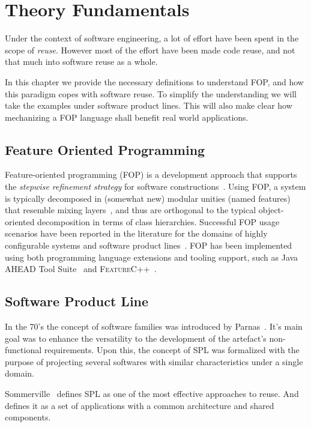 \chapter{Theory Fundamentals}\label{chap:theo-fund}
Under the context of software engineering, a lot of effort have been spent in the scope of \textit{reuse}.
However most of the effort have been made code reuse, and not that much into software reuse as a whole.

In this chapter we provide the necessary definitions to understand \gls{FOP},
and how this paradigm copes with software reuse.
To simplify the understanding we will take the examples under software product lines.
This will also make clear how mechanizing a \gls{FOP} language shall benefit real world applications.


\section{Feature Oriented Programming}\label{seq:fop}

Feature-oriented programming (FOP) is a development approach 
that supports the \emph{stepwise refinement strategy} for software 
constructions~\cite{batory-tse2004}. Using FOP, a system is 
typically decomposed in (somewhat new) modular unities 
(named features) that resemble mixing layers~\cite{bracha-ecoop1990}, 
and thus are orthogonal to the typical object-oriented 
decomposition in terms of class hierarchies. 
Successful FOP usage scenarios have been reported in the literature 
for the domains of highly configurable systems and
software product lines~\cite{mezini2004variability, apel2009overview}.
FOP has been implemented using both programming 
language extensions and tooling support, such as 
Java AHEAD Tool Suite~\cite{batory_feature-oriented_2004} and \textsc{FeatureC++}~\cite{apel_featurec++:_2005}. 


\section{Software Product Line}
In the 70's the concept of software families was introduced by Parnas~\cite{parnas1976design}. 
It's main goal was to enhance the versatility to the development of the artefact's 
non-functional requirements. Upon this, the concept of \gls{SPL}
was formalized with the purpose of projecting several softwares
with similar characteristics under a single domain.

Sommerville~\cite{Sommerville:2010:SE:1841764} defines \gls{SPL} as one of the most effective approaches to reuse.
And defines it as a set of applications with a common architecture and shared components.

